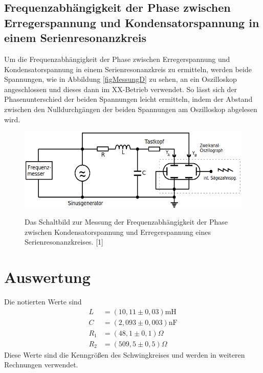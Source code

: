 \documentclass[titlepage = firstcover]{scrartcl}
\begin{document}
        \subsection{Frequenzabhängigkeit der Phase zwischen Erregerspannung und Kondensatorspannung in einem Serienresonanzkreis}
            Um die Frequenzabhängigkeit der Phase zwischen Erregerspannung und Kondensatorspannung in einem Serienresonanzkreis zu ermitteln, werden beide 
            Spannungen, wie in Abbildung \ref{figMessungD} zu sehen, an ein Oszilloskop angeschlossen und dieses dann im XX-Betrieb verwendet. So lässt sich der Phasenunterschied der beiden Spannungen leicht ermitteln, indem der Abstand zwischen den Nulldurchgängen der beiden Spannungen am Oszilloskop
            abgelesen wird.
            \begin{figure}[h]
                \centering
                \caption{Das Schaltbild zur Messung der Frequenzabhängigkeit der Phase zwischen Kondensatorspannung und Erregerspannung eines Serienresonanzkreises. [1]}
                \includegraphics[width = 0.4\linewidth]{MessungD.png}
                \label{fig:MessungD}
              \end{figure}
              \FloatBarrier

    \section{Auswertung}
        Die notierten Werte sind
        \begin{align}
            L &= (10,11 \pm 0,03) \text{mH} \\
            C &= (2,093 \pm 0,003) \text{nF} \\
            R_1 &= (48,1 \pm 0,1) \Omega \\
            R_2 &= (509,5 \pm 0,5) \Omega
        \end{align}
        Diese Werte sind die Kenngrößen des Schwingkreises und werden in weiteren Rechnungen verwendet.
\end{document}

